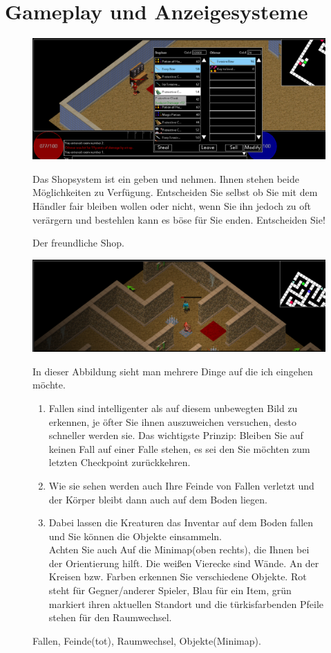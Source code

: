 \documentclass[12pt, a4paper]{scrreprt}
\begin{document}
\chapter{Gameplay und Anzeigesysteme}
\begin{figure}[h]
\includegraphics[width=\textwidth]{img/shop_system}
\caption{Der freundliche Shop.}
\vspace{1cm}
Das Shopsystem ist ein geben und nehmen. Ihnen stehen beide Möglichkeiten zu Verfügung. Entscheiden Sie selbst ob Sie mit dem Händler fair bleiben wollen oder nicht, wenn Sie ihn jedoch zu oft verärgern und bestehlen kann es böse für Sie enden. Entscheiden Sie!
\end{figure}
\begin{figure}[h]
\includegraphics[width=\textwidth]{img/trap_enemy(dead)_transportarrow_objekt(blue)}
\caption{Fallen, Feinde(tot), Raumwechsel, Objekte(Minimap).}
\vspace{1cm}
In dieser Abbildung sieht man mehrere Dinge auf die ich eingehen möchte.
\begin{enumerate}
\item Fallen sind intelligenter als auf diesem unbewegten Bild zu erkennen, je öfter Sie ihnen auszuweichen versuchen, desto schneller werden sie. Das wichtigste Prinzip: Bleiben Sie auf keinen Fall auf einer Falle stehen, es sei den Sie möchten zum letzten Checkpoint zurückkehren.
\item Wie sie sehen werden auch Ihre Feinde von Fallen verletzt und der Körper bleibt dann auch auf dem Boden liegen.
\item Dabei lassen die Kreaturen das Inventar auf dem Boden fallen und Sie können die Objekte einsammeln.\\
Achten Sie auch Auf die Minimap(oben rechts), die Ihnen bei der Orientierung hilft. Die weißen Vierecke sind Wände. An der Kreisen bzw. Farben erkennen Sie verschiedene Objekte. Rot steht für Gegner/anderer Spieler, Blau für ein Item, grün markiert ihren aktuellen Standort und die türkisfarbenden Pfeile stehen für den Raumwechsel.
\end{enumerate}
\end{figure}
\end{document}
